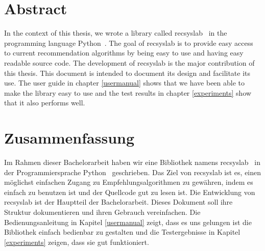 \begingroup
\let\clearpage\relax
\let\cleardoublepage\relax
\let\cleardoublepage\relax

\chapter*{Abstract}
In the context of this thesis, we wrote a library called recsyslab~\cite{recsyslab} 
in the programming language Python~\cite{python}. The goal of recsyslab is
to provide easy access to current recommendation algorithms by being easy to use and 
having easy readable source code.
The development of recsyslab is the major contribution of this thesis. 
This document is intended to document its design and facilitate its use.
The user guide in chapter \ref{usermanual} shows that we have been able to make the library easy to use
and the test results in chapter \ref{experiments} show that it also performs well.


\vfill

\chapter*{Zusammenfassung}
Im Rahmen dieser Bachelorarbeit haben wir eine Bibliothek namens recsyslab~\cite{recsyslab} 
in der Programmiersprache Python~\cite{python} geschrieben. Das Ziel von recsyslab ist es, einen m\"oglichst einfachen Zugang zu 
Empfehlungsalgorithmen zu gew\"ahren, indem es einfach zu benutzen ist und der Quellcode gut zu lesen ist.
Die Entwicklung von recsyslab ist der Hauptteil der Bachelorarbeit.
Dieses Dokument soll ihre Struktur dokumentieren und ihren Gebrauch vereinfachen.
Die Bedienungsanleitung in Kapitel \ref{usermanual} zeigt, dass es uns gelungen ist die Bibliothek einfach
bedienbar zu gestalten und die Testergebnisse in Kapitel \ref{experiments} zeigen, dass sie gut funktioniert.


\endgroup			

\vfill

\cleardoublepage
